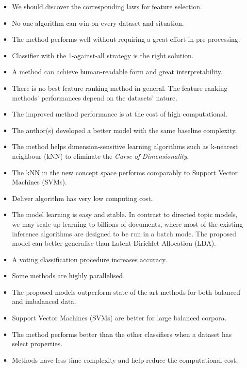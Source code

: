 \documentclass[
]{article}
\providecommand{\tightlist}{%
  \setlength{\itemsep}{0pt}\setlength{\parskip}{0pt}}
\begin{document}
\begin{itemize}
  \begin{itemize}
  \tightlist
  \item
    We should discover the corresponding laws for feature selection.
  \item
    No one algorithm can win on every dataset and situation.
  \item
    The method performs well without requiring a great effort in pre-processing.
  \item
    Classifier with the 1-against-all strategy is the right solution.
  \item
    A method can achieve human-readable form and great interpretability.
  \item
    There is no best feature ranking method in general. The feature ranking methods' performances depend on the datasets' nature.
  \item
    The improved method performance is at the cost of high computational.
  \item
    The author(s) developed a better model with the same baseline complexity.
  \item
    The method helps dimension-sensitive learning algorithms such as k-nearest neighbour (kNN) to eliminate the \emph{Curse of Dimensionality}.
  \item
    The kNN in the new concept space performs comparably to Support Vector Machines (SVMs).
  \item
    Deliver algorithm has very low computing cost.
  \item
    The model learning is easy and stable. In contrast to directed topic models, we may scale up learning to billions of documents, where most of the existing inference algorithms are designed to be run in a batch mode. The proposed model can better generalise than Latent Dirichlet Allocation (LDA).
  \item
    A voting classification procedure increases accuracy.
  \item
    Some methods are highly parallelised.
  \item
    The proposed models outperform state-of-the-art methods for both balanced and imbalanced data.
  \item
    Support Vector Machines (SVMs) are better for large balanced corpora.
  \item
    The method performs better than the other classifiers when a dataset has select properties.
  \item
    Methods have less time complexity and help reduce the computational cost.

\end{itemize}
\end{itemize}
\end{document}
